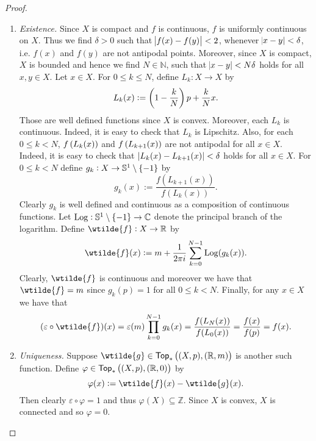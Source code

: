 \begin{proof}
	\begin{enumerate}[label = \textit{Step \arabic*:},wide = 0pt, itemsep = 1.5ex]
		\item \textit{Existence.} Since $X$ is compact and $f$ is continuous, $f$ is uniformly continuous on $X$. Thus we find $\delta > 0$ such that $\abs{f(x) - f(y)} < 2$, whenever $\abs{x - y} < \delta$, i.e. $f(x)$ and $f(y)$ are not antipodal points. Moreover, since $X$ is compact, $X$ is bounded and hence we find $N \in \mathbb{N}$, such that $\abs{x - y} < N\delta$ holds for all $x,y \in X$. Let $x \in X$. For $0 \leq k \leq N$, define $L_k : X \to X$ by
			\begin{equation*}
				L_k(x) := \del[3]{1 - \frac{k}{N}}p + \frac{k}{N}x.
			\end{equation*}
		Those are well defined functions since $X$ is convex. Moreover, each $L_k$ is continuous. Indeed, it is easy to check that $L_k$ is Lipschitz. Also, for each $0 \leq k < N$, $f\del[0]{L_k(x)}$ and $f\del[0]{L_{k + 1}(x)}$ are not antipodal for all $x \in X$. Indeed, it is easy to check that $\abs[0]{L_k(x) - L_{k + 1}(x)} < \delta$ holds for all $x \in X$. For $0 \leq k < N$ define $g_k : X \to \mathbb{S}^1 \setminus \cbr{-1}$ by
			\begin{equation*}
				g_k(x) := \frac{f(L_{k + 1}(x))}{f(L_k(x))}.
			\end{equation*}
		Clearly $g_k$ is well defined and continuous as a composition of continuous functions. Let $\Log : \mathbb{S}^1 \setminus \cbr{-1} \to \mathbb{C}$ denote the principal branch of the logarithm. Define $\wtilde{f} : X \to \mathbb{R}$ by
			\begin{equation*}
				\wtilde{f}(x) := m + \frac{1}{2\pi i} \sum_{k = 0}^{N - 1} \Log(g_k(x)).
			\end{equation*}
		Clearly, $\wtilde{f}$ is continuous and moreover we have that $\wtilde{f} = m$ since $g_k(p) = 1$ for all $0\leq k < N$. Finally, for any $x \in X$ we have that
			\begin{equation*}
				(\varepsilon \circ \wtilde{f})(x) = \varepsilon(m)\prod_{k = 0}^{N - 1} g_k(x) = \frac{f(L_N(x))}{f(L_0(x))} = \frac{f(x)}{f(p)} = f(x). 
			\end{equation*}
		\item \textit{Uniqueness.} Suppose $\wtilde{g} \in \mathsf{Top}_\ast\del[1]{(X,p),(\mathbb{R},m)}$ is another such function. Define $\varphi \in \mathsf{Top}_\ast\del[1]{(X,p),(\mathbb{R},0)}$ by
			\begin{equation*}
				\varphi(x) := \wtilde{f}(x) - \wtilde{g}(x).
			\end{equation*}
		Then clearly $\varepsilon \circ \varphi = 1$ and thus $\varphi(X) \subseteq \mathbb{Z}$. Since $X$ is convex, $X$ is connected and so $\varphi = 0$.
	\end{enumerate}
\end{proof}

